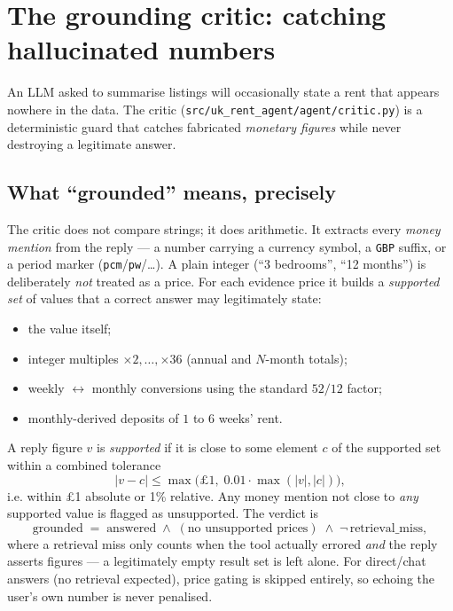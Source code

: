 \documentclass[11pt,a4paper]{article}
\newcommand{\code}[1]{\texttt{\small #1}}
\begin{document}
\section{The grounding critic: catching hallucinated numbers}
\label{sec:critic}

An LLM asked to summarise listings will occasionally state a rent that appears nowhere
in the data. The critic (\code{src/uk\_rent\_agent/agent/critic.py}) is a deterministic
guard that catches fabricated \emph{monetary figures} while never destroying a
legitimate answer.

\subsection{What ``grounded'' means, precisely}
The critic does not compare strings; it does arithmetic. It extracts every
\emph{money mention} from the reply --- a number carrying a currency symbol, a
\code{GBP} suffix, or a period marker (\code{pcm}/\code{pw}/\dots). A plain integer
(``3 bedrooms'', ``12 months'') is deliberately \emph{not} treated as a price. For each
evidence price it builds a \emph{supported set} of values that a correct answer may
legitimately state:
\begin{itemize}[leftmargin=1.4em,itemsep=1pt]
  \item the value itself;
  \item integer multiples $\times 2,\dots,\times 36$ (annual and $N$-month totals);
  \item weekly $\leftrightarrow$ monthly conversions using the standard
        $52/12$ factor;
  \item monthly-derived deposits of $1$ to $6$ weeks' rent.
\end{itemize}
A reply figure $v$ is \emph{supported} if it is close to some element $c$ of the
supported set within a combined tolerance
\[
  |v - c| \le \max\bigl(\pounds 1,\; 0.01\cdot\max(|v|,|c|)\bigr),
\]
i.e. within £1 absolute or 1\% relative. Any money mention not close to \emph{any}
supported value is flagged as unsupported. The verdict is
\[
  \text{grounded} \;=\; \text{answered} \;\wedge\; (\text{no unsupported prices})
  \;\wedge\; \neg\,\text{retrieval\_miss},
\]
where a retrieval miss only counts when the tool actually errored \emph{and} the reply
asserts figures --- a legitimately empty result set is left alone. For direct/chat
answers (no retrieval expected), price gating is skipped entirely, so echoing the
user's own number is never penalised.
\end{document}
